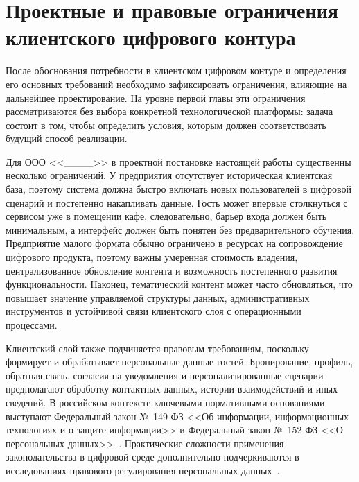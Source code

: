 \section{Проектные и правовые ограничения клиентского цифрового контура}

После обоснования потребности в клиентском цифровом контуре и определения его основных требований необходимо зафиксировать ограничения, влияющие на дальнейшее проектирование. На уровне первой главы эти ограничения рассматриваются без выбора конкретной технологической платформы: задача состоит в том, чтобы определить условия, которым должен соответствовать будущий способ реализации.

Для ООО <<\_\_\_\_>> в проектной постановке настоящей работы существенны несколько ограничений. У предприятия отсутствует историческая клиентская база, поэтому система должна быстро включать новых пользователей в цифровой сценарий и постепенно накапливать данные. Гость может впервые столкнуться с сервисом уже в помещении кафе, следовательно, барьер входа должен быть минимальным, а интерфейс должен быть понятен без предварительного обучения. Предприятие малого формата обычно ограничено в ресурсах на сопровождение цифрового продукта, поэтому важны умеренная стоимость владения, централизованное обновление контента и возможность постепенного развития функциональности. Наконец, тематический контент может часто обновляться, что повышает значение управляемой структуры данных, административных инструментов и устойчивой связи клиентского слоя с операционными процессами.

Клиентский слой также подчиняется правовым требованиям, поскольку формирует и обрабатывает персональные данные гостей. Бронирование, профиль, обратная связь, согласия на уведомления и персонализированные сценарии предполагают обработку контактных данных, истории взаимодействий и иных сведений. В российском контексте ключевыми нормативными основаниями выступают Федеральный закон №~149-ФЗ <<Об информации, информационных технологиях и о защите информации>> и Федеральный закон №~152-ФЗ <<О персональных данных>>~\cite{fz149, fz152}. Практические сложности применения законодательства в цифровой среде дополнительно подчеркиваются в исследованиях правового регулирования персональных данных~\cite{kazakevich2021, moric2024}.

